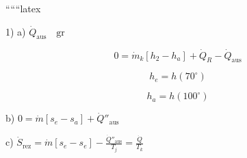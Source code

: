 
``````latex

1) a) $\dot{Q}_{\text{aus}} \quad \text{gr}$

\[
0 = \dot{m}_k \left[ h_2 - h_a \right] + \dot{Q}_R - \dot{Q}_{\text{aus}}
\]

\[
h_e = h(70^\circ)
\]

\[
h_a = h(100^\circ)
\]

b) \quad $0 = \dot{m} \left[ s_e - s_a \right] + \dot{Q}''_{\text{aus}}$

c) \quad $\dot{S}_{\text{rez}} = \dot{m} \left[ s_e - s_e \right] - \frac{\dot{Q}''_{\text{aus}}}{T_j} = \frac{\dot{Q}}{T_k}$

\[
\begin{array}{c}
\begin{array}{c}
\begin{array}{c}
\begin{array}{c}
\begin{array}{c}
\begin{array}{c}
\begin{array}{c}
\begin{array}{c}
\begin{array}{c}
\begin{array}{c}
\begin{array}{c}
\begin{array}{c}
\begin{array}{c}
\begin{array}{c}
\begin{array}{c}
\begin{array}{c}
\begin{array}{c}
\begin{array}{c}
\begin{array}{c}
\begin{array}{c}
\begin{array}{c}
\begin{array}{c}
\begin{array}{c}
\begin{array}{c}
\begin{array}{c}
\begin{array}{c}
\begin{array}{c}
\begin{array}{c}
\begin{array}{c}
\begin{array}{c}
\begin{array}{c}
\begin{array}{c}
\begin{array}{c}
\begin{array}{c}

\end{array}
\end{array}
\end{array}
\end{array}
\end{array}
\end{array}
\end{array}
\end{array}
\end{array}
\end{array}
\end{array}
\end{array}
\end{array}
\end{array}
\end{array}
\end{array}
\end{array}
\end{array}
\end{array}
\end{array}
\end{array}
\end{array}
\end{array}
\end{array}
\end{array}
\end{array}
\end{array}
\end{array}
\end{array}
\end{array}
\end{array}
\end{array}
\end{array}
\end{array}\]
